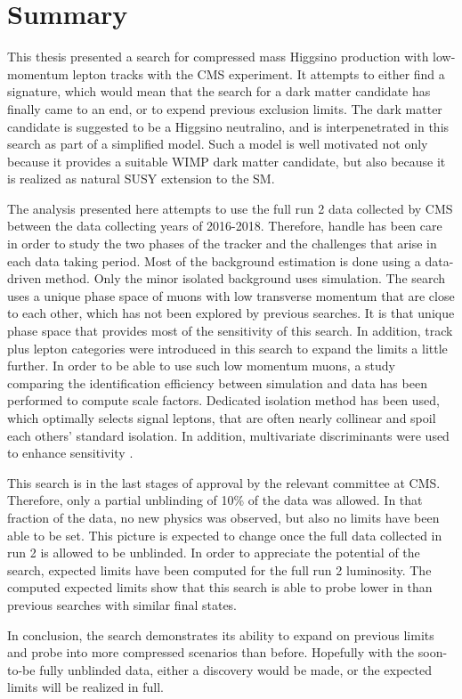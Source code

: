 \chapter{Summary}
\label{sec:summary}

This thesis presented a search for compressed mass Higgsino production with low-momentum lepton tracks with the CMS experiment. It attempts to either find a signature, which would mean that the search for a dark matter candidate has finally came to an end, or to expend previous exclusion limits. The dark matter candidate is suggested to be a Higgsino neutralino, and is interpenetrated in this search as part of a simplified model. Such a model is well motivated not only because it provides a suitable WIMP dark matter candidate, but also because it is realized as natural SUSY extension to the SM.

The analysis presented here attempts to use the full run 2 data collected by CMS between the data collecting years of 2016-2018. Therefore, handle has been care in order to study the two phases of the tracker and the challenges that arise in each data taking period. Most of the background estimation is done using a data-driven method. Only the minor isolated background uses simulation. The search uses a unique phase space of muons with low transverse momentum that are close to each other, which has not been explored by previous searches. It is that unique phase space that provides most of the sensitivity of this search. In addition,  track plus lepton categories were introduced in this search to expand the limits a little further. In order to be able to use such low momentum muons, a study comparing the identification efficiency between simulation and data has been performed to compute scale factors. Dedicated isolation method has been used, which optimally selects signal leptons, that are often nearly collinear and spoil each others' standard isolation. In addition, multivariate discriminants were used to enhance sensitivity .

This search is in the last stages of approval by the relevant committee at CMS. Therefore, only a partial unblinding of 10\% of the data was allowed. In that fraction of the data, no new physics was observed, but also no limits have been able to be set. This picture is expected to change once the full data collected in run 2 is allowed to be unblinded. In order to appreciate the potential of the search, expected limits have been computed for the full run 2 luminosity. The computed expected limits show that this search is able to probe lower in \dm than previous searches with similar final states.

In conclusion, the search demonstrates its ability to expand on previous limits and probe into more compressed scenarios than before. Hopefully with the soon-to-be fully unblinded data, either a discovery would be made, or the expected limits will be realized in full.